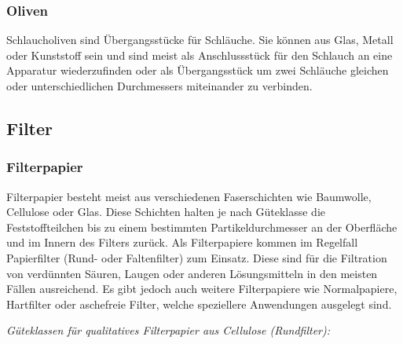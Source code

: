 \vspace{5mm}

\subsubsection*{Oliven}
Schlaucholiven sind Übergangsstücke für Schläuche. Sie können aus Glas, Metall oder Kunststoff sein und sind meist als Anschlussstück für den Schlauch an eine Apparatur wiederzufinden oder als Übergangsstück um zwei Schläuche gleichen oder unterschiedlichen Durchmessers miteinander zu verbinden.


\subsection{Filter}
\subsubsection*{Filterpapier}
Filterpapier besteht meist aus verschiedenen Faserschichten wie Baumwolle, Cellulose oder Glas. Diese Schichten halten je nach Güteklasse die Feststoffteilchen bis zu einem bestimmten Partikeldurchmesser an der Oberfläche und im Innern des Filters zurück. Als Filterpapiere kommen im Regelfall Papierfilter (Rund- oder Faltenfilter) zum Einsatz. Diese sind für die Filtration von verdünnten Säuren, Laugen oder anderen Lösungsmitteln in den meisten Fällen ausreichend. Es gibt jedoch auch weitere Filterpapiere wie Normalpapiere, Hartfilter oder aschefreie Filter, welche speziellere Anwendungen ausgelegt sind.\\
\newpage

\textit{Güteklassen für qualitatives Filterpapier aus Cellulose (Rundfilter):}

